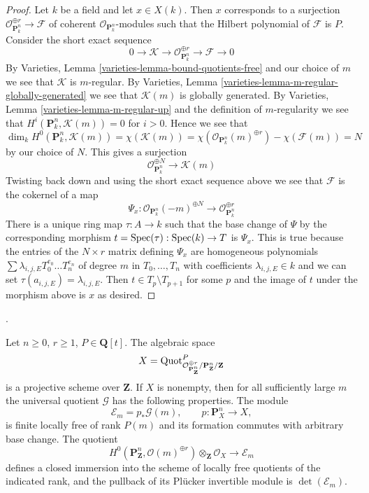 \begin{proof}
\medskip\noindent
Let $k$ be a field and let $x \in X(k)$. Then $x$ corresponds to
a surjection $\mathcal{O}_{\mathbf{P}^n_k}^{\oplus r} \to \mathcal{F}$
of coherent $\mathcal{O}_{\mathbf{P}^n_k}$-modules
such that the Hilbert polynomial of $\mathcal{F}$ is $P$.
Consider the short exact sequence
$$
0 \to \mathcal{K} \to
\mathcal{O}_{\mathbf{P}^n_k}^{\oplus r} \to
\mathcal{F} \to 0
$$
By Varieties, Lemma \ref{varieties-lemma-bound-quotients-free}
and our choice of $m$ we see that $\mathcal{K}$ is $m$-regular.
By Varieties, Lemma \ref{varieties-lemma-m-regular-globally-generated}
we see that $\mathcal{K}(m)$ is globally generated.
By Varieties, Lemma \ref{varieties-lemma-m-regular-up}
and the definition of $m$-regularity we see that
$H^i(\mathbf{P}^n_k, \mathcal{K}(m)) = 0$ for $i > 0$.
Hence we see that
$$
\dim_k H^0(\mathbf{P}^n_k, \mathcal{K}(m)) =
\chi(\mathcal{K}(m)) =
\chi(\mathcal{O}_{\mathbf{P}^n_k}(m)^{\oplus r}) -
\chi(\mathcal{F}(m)) = N
$$
by our choice of $N$. This gives a surjection
$$
\mathcal{O}_{\mathbf{P}^n_k}^{\oplus N}
\longrightarrow
\mathcal{K}(m)
$$
Twisting back down and using the short exact sequence above
we see that $\mathcal{F}$ is the cokernel of a map
$$
\Psi_x :
\mathcal{O}_{\mathbf{P}^n_k}(-m)^{\oplus N}
\to
\mathcal{O}_{\mathbf{P}^n_k}^{\oplus r}
$$
There is a unique ring map $\tau : A \to k$ such that the base change
of $\Psi$ by the corresponding morphism $t = \mathop{\mathrm{Spec}}(\tau) : \mathop{\mathrm{Spec}}(k) \to T$
is $\Psi_x$. This is true because the entries of the $N \times r$
matrix defining $\Psi_x$ are homogeneous polynomials
$\sum \lambda_{i, j, E} T_0^{e_0} \ldots T_n^{e_n}$
of degree $m$ in $T_0, \ldots, T_n$ with coefficients
$\lambda_{i, j, E} \in k$ and we can set
$\tau(a_{i, j, E}) = \lambda_{i, j, E}$.
Then $t \in T_p \setminus T_{p + 1}$ for some $p$ and
the image of $t$ under the morphism above is $x$ as desired.
\end{proof}

\begin{lemma}
\label{lemma-quot-Pn-projective}
\begin{reference}
\cite[Expos\'e 221, Lemma 3.3, Theorem 3.2, and Proposition 3.8,
pp. 260--266]{FGA}.
\end{reference}
Let $n \geq 0$, $r \geq 1$, $P \in \mathbf{Q}[t]$. The algebraic space
$$
X = \mathrm{Quot}^P_{\mathcal{O}^{\oplus r}_{\mathbf{P}^n_\mathbf{Z}}/
\mathbf{P}^n_\mathbf{Z}/\mathbf{Z}}
$$
is a projective scheme over $\mathbf{Z}$. If $X$ is nonempty, then for
all sufficiently large $m$ the universal quotient $\mathcal{G}$ has the
following properties. The module
$$
\mathcal{E}_m = p_*\mathcal{G}(m),\qquad
p : \mathbf{P}^n_X \longrightarrow X,
$$
is finite locally free of rank $P(m)$ and its formation commutes with
arbitrary base change. The quotient
$$
H^0(\mathbf{P}^n_\mathbf{Z},
\mathcal{O}(m)^{\oplus r}) \otimes_\mathbf{Z} \mathcal{O}_X
\longrightarrow \mathcal{E}_m
$$
defines a closed immersion into the scheme of locally free quotients
of the indicated rank, and the pullback of its Pl\"ucker invertible
module is $\det(\mathcal{E}_m)$.
\end{lemma}

